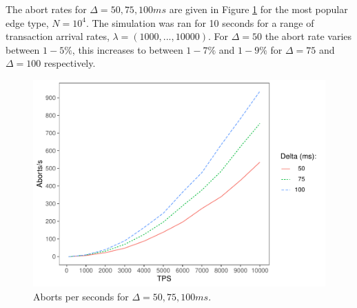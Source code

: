 The abort rates for $\Delta = 50, 75, 100ms$ are given in Figure \ref{aborts-results} for the most popular edge type, $N=10^4$. The simulation was ran for 10 seconds for a range of transaction arrival rates, $\lambda = (1000, ..., 10000)$. For $\Delta = 50$ the abort rate varies between $1-5\%$, this increases to between $1-7\%$ and $1-9\%$ for $\Delta = 75$ and $\Delta = 100$ respectively.

\begin{figure}[h]
  \centering
 \includegraphics[width=\linewidth]{./figures/aborts}
  \caption{Aborts per seconds for $\Delta = 50, 75, 100ms$.}
  \label{aborts-results}
\end{figure}
